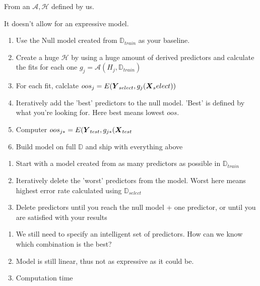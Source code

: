\documentclass[12pt]{article}
\newcommand{\D}{\mathbb{D}}
\newcommand{\calA}{\mathcal{A}}
\newcommand{\calH}{\mathcal{H}}
\begin{document}
\begin{enumerate}


From an $\calA, \calH$ defined by us.


It doesn't allow for an expressive model.


\begin{enumerate}
\item Use the Null model created from $\D_{train}$ as your baseline.
\item Create a huge $\calH$ by using a huge amount of derived predictors and calculate the fits for each one $g_j=\calA(H_j, \D_{train})$
\item For each fit, calclate $oos_j=E(\boldsymbol{Y}_{select}, g_j(\boldsymbol{X}_select))$
\item Iteratively add the 'best' predictors to the null model. 'Best' is defined by what you're looking for. Here best means lowest $oos$. 
\item Computer $oos_{j*}=E(\boldsymbol{Y}_{test}, g_{j*}(\boldsymbol{X}_{test}$
\item Build model on full $\D$ and ship with everything above
\end{enumerate}



\begin{enumerate}
\item Start with a model created from as many predictors as possible in $\D_{train}$
\item Iteratively delete the 'worst' predictors from the model. Worst here means highest error rate calculated using $\D_{select}$
\item Delete predictors until you reach the null model + one predictor, or until you are satisfied with your results
\end{enumerate}


\begin{enumerate}
\item We still need to specify an intelligent set of predictors. How can we know which combination is the best? 
\item Model is still linear, thus not as expressive as it could be.
\item Computation time
\end{enumerate}



\end{enumerate}
\end{document}
